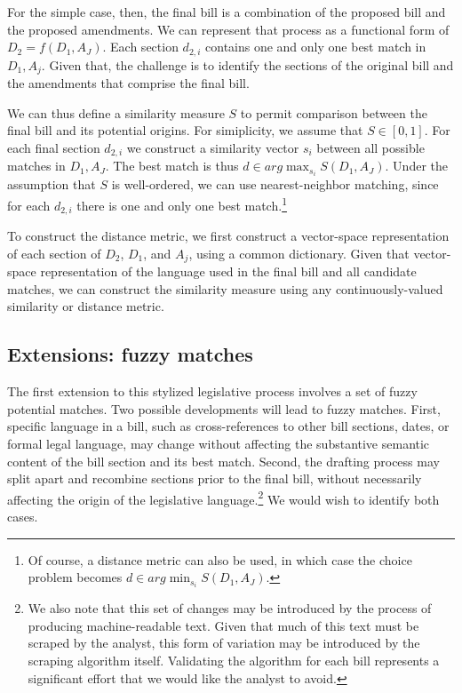 \documentclass[11pt]{article}
\begin{document}
For the simple case, then, the final bill is a
combination of the proposed bill and the proposed
amendments. We can represent that process as a functional form of $D_2
= f(D_1, A_J)$. Each section $d_{2,i}$ contains one and only one best
match in $D_1, A_j$. Given that, the challenge is to identify the sections
of the original bill and the amendments that comprise the final
bill. 

We can thus define a similarity measure $S$ to permit comparison
between the final bill and its potential origins. For simiplicity, we
assume that $S \in [0,1]$. For each final section $d_{2,i}$ we
construct a similarity vector $s_i$ between all possible matches in
$D_1, A_J$. The best match is thus $d \in arg \max_{s_i} S(D_1,
A_J)$. Under the assumption that $S$ is well-ordered, we can use
nearest-neighbor matching, since for each $d_{2,i}$ there is one and
only one best match.\footnote{Of course, a distance metric can also be
used, in which case the choice problem becomes $d \in arg \min_{s_i}
S(D_1, A_J)$.}

To construct the distance metric, we first construct a vector-space
representation of each section of $D_2$, $D_1$, and $A_j$, using a
common dictionary. Given that vector-space representation of the
language used in the final bill and all candidate matches, we can
construct the similarity measure using any continuously-valued
similarity or distance metric.

\subsection{Extensions: fuzzy matches}
\label{sec:extens-fuzzy-match}

The first extension to this stylized legislative process involves a
set of fuzzy potential matches. Two possible developments will lead to
fuzzy matches. First, specific language in a bill, such as
cross-references to other bill sections, dates, or formal legal
language, may change without affecting the substantive semantic
content of the bill section and its best match. Second, the drafting
process may split apart and recombine sections prior to the final
bill, without necessarily affecting the origin of the legislative
language.\footnote{We also note that this set of changes may be
  introduced by the process of producing machine-readable text. Given
  that much of this text must be scraped by the analyst, this form of
  variation may be introduced by the scraping algorithm
  itself. Validating the algorithm for each bill represents a
  significant effort that we would like the analyst to avoid.} We would wish to identify both cases.
\end{document}
